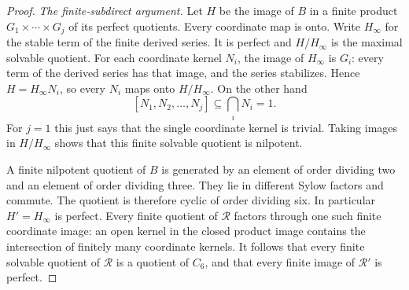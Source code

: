 \begin{proof}
\emph{The finite-subdirect argument.}
Let $H$ be the image of $B$ in a finite product
$G_1\times\cdots\times G_j$ of its perfect quotients.
Every coordinate map is onto. Write $H_\infty$ for
the stable term of the finite derived series. It is
perfect and $H/H_\infty$ is the maximal solvable quotient.
For each coordinate kernel $N_i$, the image of
$H_\infty$ is $G_i$: every term of the derived series
has that image, and the series stabilizes. Hence
$H=H_\infty N_i$, so every $N_i$ maps onto
$H/H_\infty$. On the other hand
\[
 [N_1,N_2,\ldots,N_j]\subseteq\bigcap_iN_i=1.
                                                               \tag{D.40.9}
\]
For $j=1$ this just says that the single coordinate
kernel is trivial. Taking images in $H/H_\infty$ shows
that this finite solvable quotient is nilpotent.

A finite nilpotent quotient of $B$ is generated by
an element of order dividing two and an element of
order dividing three. They lie in different Sylow
factors and commute. The quotient is therefore cyclic
of order dividing six. In particular $H'=H_\infty$
is perfect. Every finite quotient of $\mathcal R$
factors through one such finite coordinate image:
an open kernel in the closed product image contains
the intersection of finitely many coordinate kernels.
It follows that every finite solvable quotient of
$\mathcal R$ is a quotient of $C_6$, and that every
finite image of $\mathcal R'$ is perfect.


\end{proof}
